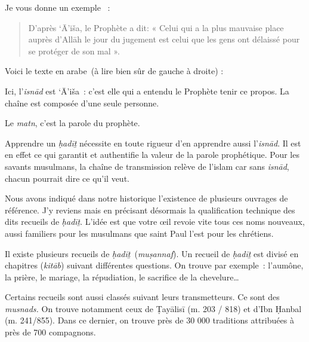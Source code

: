 Je vous donne un exemple~ :

\begin{quote}
    D'après `Ā'iša, le Prophète a dit: « Celui qui a la plus mauvaise place
auprès d'Allāh le jour du jugement est celui que les gens ont délaissé
pour se protéger de son mal ».\\
\end{quote}



Voici le texte en arabe~(à lire bien sûr de gauche à droite) :
\begin{quote}
    

\end{quote}
Ici, l'\emph{isnād} est `Ā'iša~: c'est elle qui a entendu le Prophète
tenir ce propos. La chaîne est composée d'une seule personne.

Le \emph{matn}, c'est la parole du prophète.

Apprendre un \emph{ḥadīṯ} nécessite en toute rigueur d'en apprendre
aussi l'\emph{isnād}. Il est en effet ce qui garantit et authentifie la
valeur de la parole prophétique. Pour les savants musulmans, la chaîne
de transmission relève de l'islam car sans \emph{isnād}, chacun pourrait
dire ce qu'il veut.


Nous avons indiqué dans notre historique l'existence de plusieurs
ouvrages de référence. J'y reviens mais en précisant désormais la
qualification technique des dits recueils de \emph{ḥadīṯ}. L'idée est
que votre œil revoie vite tous ces noms nouveaux, aussi familiers pour
les musulmans que saint Paul l'est pour les chrétiens.

Il existe plusieurs recueils de \emph{ḥadīṯ}~(\emph{muṣannaf}). Un
recueil de \emph{ḥadīṯ} est divisé en chapitres (\emph{kitāb}) suivant
différentes questions. On trouve par exemple~: l'aumône, la prière, le
mariage, la répudiation, le sacrifice de la chevelure\ldots{}

Certains recueils sont aussi classés suivant leurs transmetteurs. Ce
sont des \emph{musnads.} On trouve notamment ceux de Ṭayālisī (m. 203 /
818) et d'Ibn Ḥanbal \label{Theol:IbnHanbal1} (m. 241/855). Dans ce dernier, on trouve près de 30
000 traditions attribuées à près de 700 compagnons.

